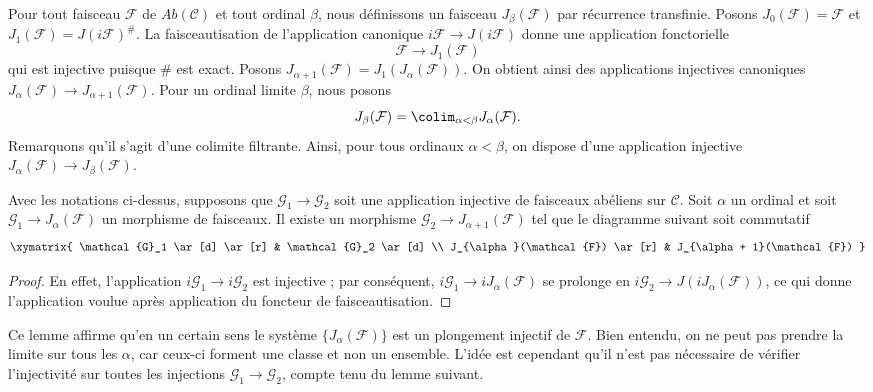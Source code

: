 \medskip\noindent
Pour tout faisceau $\mathcal{F}$ de $\textit{Ab}(\mathcal{C})$ et tout
ordinal $\beta$, nous définissons un faisceau $J_\beta(\mathcal{F})$ par
récurrence transfinie. Posons $J_0(\mathcal{F}) = \mathcal{F}$ et
$J_1(\mathcal{F}) = J(i\mathcal{F})^\#$. La faisceautisation de
l'application canonique $i\mathcal{F} \to J(i\mathcal{F})$ donne une
application fonctorielle
$$
\mathcal{F} \longrightarrow J_1(\mathcal{F})
$$
qui est injective puisque $\#$ est exact. Posons
$J_{\alpha + 1}(\mathcal{F}) = J_1(J_\alpha(\mathcal{F}))$. On obtient ainsi
des applications injectives canoniques
$J_\alpha(\mathcal{F}) \to J_{\alpha + 1}(\mathcal{F})$. Pour un ordinal
limite $\beta$, nous posons
$$
J_\beta(\mathcal{F}) = \colim_{\alpha < \beta} J_\alpha(\mathcal{F}).
$$
Remarquons qu'il s'agit d'une colimite filtrante. Ainsi, pour tous ordinaux
$\alpha < \beta$, on dispose d'une application injective
$J_\alpha(\mathcal{F}) \to J_\beta(\mathcal{F})$.

\begin{lemma}
\label{lemma-map-into-next-one}
Avec les notations ci-dessus, supposons que
$\mathcal{G}_1 \to \mathcal{G}_2$ soit une application injective de faisceaux
abéliens sur $\mathcal{C}$. Soit $\alpha$ un ordinal et soit
$\mathcal{G}_1 \to J_\alpha(\mathcal{F})$ un morphisme de faisceaux. Il existe
un morphisme $\mathcal{G}_2 \to J_{\alpha + 1}(\mathcal{F})$ tel que le
diagramme suivant soit commutatif
$$
\xymatrix{
\mathcal{G}_1 \ar[d] \ar[r] & \mathcal{G}_2 \ar[d] \\
J_{\alpha}(\mathcal{F}) \ar[r] & J_{\alpha + 1}(\mathcal{F}) }
$$
\end{lemma}

\begin{proof}
En effet, l'application $i\mathcal{G}_1 \to i\mathcal{G}_2$ est injective ;
par conséquent, $i\mathcal{G}_1 \to iJ_\alpha(\mathcal{F})$ se prolonge en
$i\mathcal{G}_2 \to J(iJ_\alpha(\mathcal{F}))$, ce qui donne l'application
voulue après application du foncteur de faisceautisation.
\end{proof}

\noindent
Ce lemme affirme qu'en un certain sens le système
$\{J_{\alpha}(\mathcal{F})\}$ est un plongement injectif de $\mathcal{F}$.
Bien entendu, on ne peut pas prendre la limite sur tous les $\alpha$, car
ceux-ci forment une classe et non un ensemble. L'idée est cependant qu'il
n'est pas nécessaire de vérifier l'injectivité sur toutes les injections
$\mathcal{G}_1 \to \mathcal{G}_2$, compte tenu du lemme suivant.

